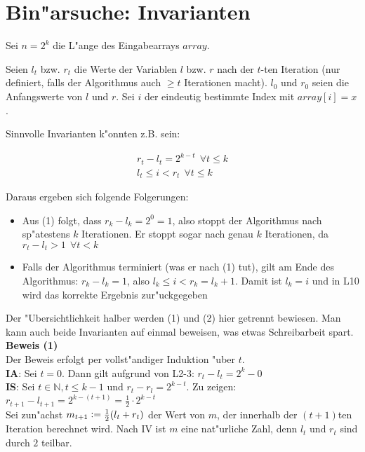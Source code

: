 \documentclass{scrartcl}
\newcommand{\defeq}{\vcentcolon=}
\begin{document}
\section{Bin"arsuche: Invarianten}

Sei $n = 2^k$ die L"ange des Eingabearrays $array$.

Seien $l_t$ bzw. $r_t$ die Werte der Variablen $l$ bzw. $r$ nach der $t$-ten Iteration (nur definiert, falls der Algorithmus auch
$\geq t$ Iterationen macht). $l_0$ und $r_0$ seien die Anfangswerte von $l$ und $r$.
Sei $i$ der eindeutig bestimmte Index mit $array[i] = x$.

Sinnvolle Invarianten k"onnten z.B. sein:

\begin{align}
r_t - l_t = 2^{k-t} \ \ \forall t \leq k \\
l_t \leq i < r_t \ \ \forall t \leq k
\end{align}

Daraus ergeben sich folgende Folgerungen:

\begin{itemize}
\item Aus (1) folgt, dass $r_k - l_k = 2^0 = 1$, also stoppt der Algorithmus nach sp"atestens $k$ Iterationen.
Er stoppt sogar nach genau $k$ Iterationen, da $r_t - l_t > 1 \ \ \forall t < k$
\item Falls der Algorithmus terminiert (was er nach (1) tut), gilt am Ende des Algorithmus:
      $r_k - l_k = 1$, also $l_k \leq i < r_k = l_k + 1$. Damit ist $l_k = i$ und in L10 wird
      das korrekte Ergebnis zur"uckgegeben
\end{itemize}

Der "Ubersichtlichkeit halber werden (1) und (2) hier getrennt bewiesen. Man kann auch
beide Invarianten auf einmal beweisen, was etwas Schreibarbeit spart. \\

\noindent\textbf{Beweis (1)}\\

Der Beweis erfolgt per vollst"andiger Induktion "uber $t$.\\

\noindent\textbf{IA}: Sei $t = 0$. Dann gilt aufgrund von L2-3: $r_t - l_t = 2^k - 0$ \\
\textbf{IS}: Sei $t \in \mathbb{N}, t \leq k - 1$ und $r_t - r_l = 2^{k-t}$. Zu zeigen: $r_{t+1} - l_{t+1} = 2^{k-(t+1)} = \frac{1}{2}\cdot 2^{k-t}$ \\

Sei zun"achst $m_{t+1} \defeq \frac{1}{2}(l_t + r_t)$ der Wert von $m$, der innerhalb der $(t+1)$ten Iteration berechnet wird.
Nach IV ist $m$ eine nat"urliche Zahl, denn $l_t$ und $r_t$ sind durch $2$ teilbar.
\end{document}
